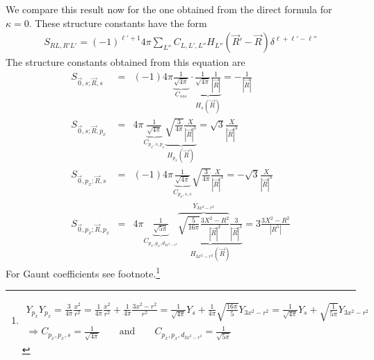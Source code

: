 \documentclass[11pt,a4paper]{report}
\begin{document}
We compare this result now for the one obtained from the direct
formula for $\kappa=0$. These structure constants have the form
\begin{eqnarray}
S_{RL,R'L'}=(-1)^{\ell'+1} 4\pi \sum_{L''} C_{L,L',L''} 
H_{L''}(\vec{R}'-\vec{R})
\delta^{\ell+\ell'-\ell''}
\end{eqnarray}
The structure constants obtained from this equation are
\begin{eqnarray}
S_{\vec{0},s;\vec{R},s}&=&(-1) 4\pi \underbrace{\frac{1}{\sqrt{4\pi}}}_{C_{sss}}
\cdot\underbrace{\frac{1}{\sqrt{4\pi}}\frac{1}{|\vec{R}|}}_{H_s(\vec{R})}
=-\frac{1}{|\vec{R}|}
\nonumber\\
S_{\vec{0},s;\vec{R},p_x}&=& 4\pi
\underbrace{\frac{1}{\sqrt{4\pi}}}_{C_{p_x,s,p_x}}
\underbrace{
\sqrt{\frac{3}{4\pi}}\frac{X}{|\vec{R}|^3}}
_{H_{p_x}(\vec{R})}
=\sqrt{3}\frac{X}{|\vec{R}|^3}
\nonumber\\
S_{\vec{0},p_x;\vec{R},s}&=& (-1)4\pi
\underbrace{\frac{1}{\sqrt{4\pi}}}_{C_{p_x,s,s}}\sqrt{\frac{3}{4\pi}}
\frac{X}{|\vec{R}|^3}=-\sqrt{3}\frac{X}{|\vec{R}|^3}
\nonumber\\
S_{\vec{0},p_x;\vec{R},p_x}&=& 4\pi
\underbrace{\frac{1}{\sqrt{5\pi}}}_{C_{p_x,p_x,d_{3x^2-r^2}}}
\underbrace{
\overbrace{\sqrt{\frac{5}{16\pi}} \frac{3X^2-R^2}{|\vec{R}|^2}}^{Y_{3x^2-r^2}}
\frac{3}{|\vec{R}|^{3}}
}_{H_{3x^2-r^2}(\vec{R})}
=3\frac{3X^2-R^2}{|R^5|}
\end{eqnarray}
For Gaunt coefficients see footnote.\footnote{
\begin{eqnarray}
Y_{p_x}Y_{p_x}=\frac{3}{4\pi}\frac{x^2}{r^2}
=\frac{1}{4\pi}\frac{x^2}{r^2} +\frac{1}{4\pi}\frac{3x^2-r^2}{r^2}
=\frac{1}{\sqrt{4\pi}}Y_s +\frac{1}{4\pi}\sqrt{\frac{16\pi}{5}}
Y_{3x^2-r^2}
=\frac{1}{\sqrt{4\pi}}Y_s +\sqrt{\frac{1}{5\pi}}Y_{3x^2-r^2}
\nonumber\\
\Rightarrow 
C_{p_x,p_x,s}=\frac{1}{\sqrt{4\pi}}\qquad\text{and}\qquad
C_{p_x,p_x,d_{3x^2-r^2}}=\frac{1}{\sqrt{5\pi}}
\end{eqnarray}}




\end{document}
